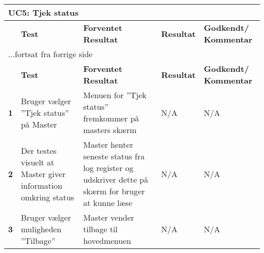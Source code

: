 \begin{center}
\begin{longtable}{|p{}|p{}|p{}|p{}|p{}|} %
\hline
\multicolumn{5}{|l|}{\textbf{UC5: Tjek status}} \\ \hline
\multicolumn{1}{|c|}{} &
\textbf{Test} &
\textbf{Forventet \newline Resultat} &
\textbf{Resultat} &
\textbf{Godkendt/ \newline Kommentar} \\ \hline 
\endfirsthead

\multicolumn{5}{l}{...fortsat fra forrige side} \\ \hline 
\multicolumn{1}{|c|}{} &
\textbf{Test} &
\textbf{Forventet \newline Resultat} &
\textbf{Resultat} &
\textbf{Godkendt/ \newline Kommentar} \\ \hline 
\endhead

\textbf{1}	&Bruger vælger ''Tjek status'' på Master
			&Menuen for ''Tjek status'' fremkommer på masters skærm
			&N/A
			&N/A \\ \hline 
			
\textbf{2}	&Der testes visuelt at Master giver information omkring status 
			&Master henter seneste status fra log register og udskriver dette på skærm for bruger at kunne læse
			&N/A
			&N/A \\ \hline 

\textbf{3}	&Bruger vælger muligheden ''Tilbage''
			&Master vender tilbage til hovedmenuen
			&N/A
			&N/A \\ \hline 
			
\end{longtable}
	\label{ATUC7} 
\end{center}
